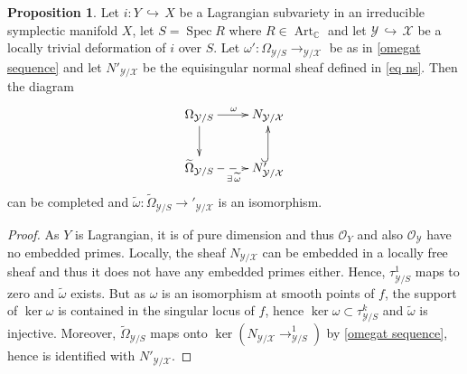 \documentclass[a4paper,11pt,final]{amsart}
\theoremstyle{plain}
\theoremstyle{definition}
\newtheorem{Prop}[subsection]{Proposition}
\numberwithin{equation}{section}
\theoremstyle{remark}
\begin{document}
\begin{Prop}\label{prop omega is normal}
Let $i:Y{{\, \hookrightarrow\,}} X$ be a Lagrangian subvariety in an irreducible symplectic manifold $X$, let $S={\operatorname{Spec}} R$ where $R\in {\operatorname{Art}}_{{\mathbb C}}$ and let ${{\mathcal Y}} {{\, \hookrightarrow\,}} {{\mathcal X}}$ be a locally trivial deformation of $i$ over $S$. Let $\omega':\Omega_{{{\mathcal Y}}/S} {\xrightarrow{\ \ }}_{{{\mathcal Y}}/{{\mathcal X}}}$ be as in \eqref{omegat sequence} and let $N'_{{{\mathcal Y}}/{{\mathcal X}}}$ be the equisingular normal sheaf defined in \eqref{eq ns}. Then the diagram 
\begin{equation}\label{eq omega normal bundle}
\begin{xy}
\xymatrix{
\Omega_{{{\mathcal Y}}/S} \ar[r]^\omega\ar[d]& N_{{{\mathcal Y}}/{{\mathcal X}}}\\
{\widetilde{\Omega}}_{{{\mathcal Y}}/S} \ar@{-->}[r]_{\exists \, {\widetilde{\omega}}}  & N'_{{{\mathcal Y}}/{{\mathcal X}}}\ar@{^(->}[u]\\
}
\end{xy}
\end{equation}
can be completed and ${\widetilde{\omega}}:{\widetilde{\Omega}}_{{{\mathcal Y}}/S}{\xrightarrow{\ \ }}'_{{{\mathcal Y}}/{{\mathcal X}}}$ is an isomorphism.
\end{Prop}
\begin{proof}
As $Y$ is Lagrangian, it is of pure dimension and thus ${{\mathcal O}}_Y$ and also ${{\mathcal O}}_{{\mathcal Y}}$ have no embedded primes. Locally, the sheaf $N_{{{\mathcal Y}}/{{\mathcal X}}}$ can be embedded in a locally free sheaf and thus it does not have any embedded primes either.
Hence, $\tau^1_{{{\mathcal Y}}/S}$ maps to zero and ${\widetilde{\omega}}$ exists. But as $\omega$ is an isomorphism at smooth points of $f$, the support of $\ker \omega$ is contained in the singular locus of $f$, hence $\ker \omega \subset \tau^k_{{{\mathcal Y}}/S}$ and ${\widetilde{\omega}}$ is injective. Moreover, ${\widetilde{\Omega}}_{{{\mathcal Y}}/S}$ maps onto $\ker(N_{{{\mathcal Y}}/{{\mathcal X}}} {\xrightarrow{\ \ }}^1_{{{\mathcal Y}}/S})$ by \eqref{omegat sequence}, hence is identified with $N'_{{{\mathcal Y}}/{{\mathcal X}}}$. 
\end{proof}
\end{document}
